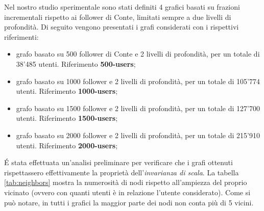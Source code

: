     \newpage
    Nel nostro studio sperimentale sono stati definiti 4 grafici basati su frazioni incrementali rispetto ai follower di Conte, limitati sempre a due livelli di profondità. Di seguito vengono presentati i grafi considerati con i rispettivi riferimenti:
    
    \begin{itemize}
        \item grafo basato su 500 follower di Conte e 2 livelli di profondità, per un totale di 38'485 utenti. Riferimento \textbf{500-users};
        \item grafo basato su 1000 follower e 2 livelli di profondità, per un totale di 105'774 utenti. Riferimento \textbf{1000-users};
        \item grafo basato su 1500 follower e 2 livelli di profondità, per un totale di 127'700 utenti. Riferimento \textbf{1500-users};
        \item grafo basato su 2000 follower e 2 livelli di profondità, per un totale di 215'910 utenti. Riferimento \textbf{2000-users};
    \end{itemize}
  
    \'E stata effettuata un'analisi preliminare per verificare che i grafi ottenuti rispettassero effettivamente la proprietà dell'\textit{invarianza di scala}. La tabella \ref{tab:neighbors} mostra la numerosità di nodi rispetto all'ampiezza del proprio vicinato (ovvero con quanti utenti è in relazione l'utente considerato). Come si può notare, in tutti i grafici la maggior parte dei nodi non conta più di 5 vicini.
    

